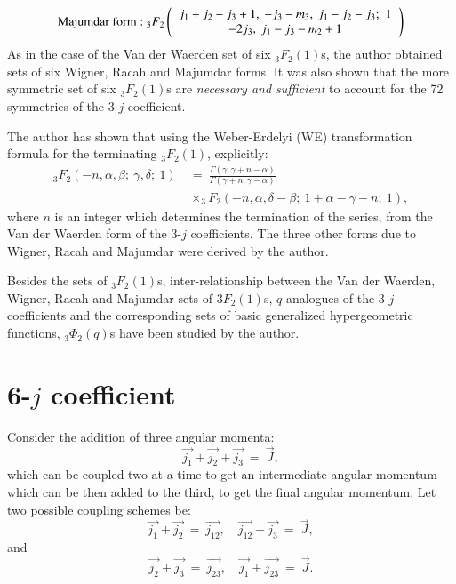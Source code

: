 \smallskip
\begin{equation}
{\rm Majumdar\ form:}\ {}_3F_2
\left(
\begin{tabular}{c}
$j_1+j_2-j_3+1,\ -j_3-m_3,\ j_1-j_2-j_3;$ \ 1\\
$-2j_3,\ j_1-j_3-m_2+1$  \\ 
\end{tabular} 
\right) \label{chap7-eq18}
\end{equation}
As in the case of the Van der Waerden set of six $_3F_2(1)$s, the author obtained sets of six Wigner, Racah and Majumdar forms. It was also shown that the more symmetric set of six $_3F_2(1)$s are \textit{necessary and sufficient} to account for the 72 symmetries of the 3-$j$ coefficient.

The author has shown that using the Weber-Erdelyi (WE) transformation formula for the terminating $_3F_2(1)$, explicitly:
\begin{equation}
\begin{split}
_3F_2(-n,\alpha,\beta ;\ \gamma,\delta;\ 1)\ & = \ \frac{\Gamma(\gamma, \gamma +n-\alpha )} {\Gamma(\gamma +n, \gamma -\alpha )}\\
& \times _3F_2(-n,\alpha,\delta -\beta;\ 1+\alpha -\gamma -n;\ 1), \label{chap7-eq19}
\end{split}
\end{equation}
where $n$ is an integer which determines the termination of the series, from the Van der Waerden form of the 3-$j$ coefficients. The three other forms due to Wigner, Racah and Majumdar were derived by the author.

Besides the sets of $_3F_2(1)$s, inter-relationship between the Van der Waerden, Wigner, Racah and Majumdar sets of $3F_2(1)$s,  $q$-analogues of the 3-$j$ coefficients and the corresponding sets of basic generalized hypergeometric functions, $_3\Phi_2(q)$s have been studied by the author.

\section*{6-$j$ coefficient}

Consider the addition of three angular momenta:
\begin{equation}
\vec{j_1} + \vec{j_2} + \vec{j_3} \ =\ \vec{J}, \label{chap7-eq20}
\end{equation}
which can be coupled two at a time to get an intermediate angular momentum which can be then added to the third, to get the final angular momentum. Let two possible coupling schemes be:
\begin{equation}
\vec{j_1} + \vec{j_2}\ =\ \vec{j_{12}}, \quad  \vec{j_{12}} + \vec{j_3} \ =\ \vec{J}, \label{chap7-eq21}
\end{equation}
and 
\begin{equation}
\vec{j_2} + \vec{j_3}\ =\ \vec{j_{23}}, \quad  \vec{j_1} + \vec{j_{23}} \ =\ \vec{J}. \label{chap7-eq22}
\end{equation}


